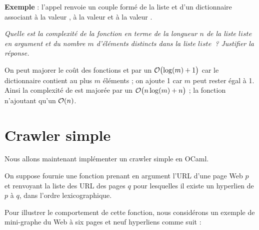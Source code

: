 {\bf Exemple} : l'appel  renvoie un couple formé de la liste \type{["x"; "zz"; "yt"]} et d'un dictionnaire associant à  la valeur , à  la valeur  et à  la valeur .
\begin{Exercise}\it
Quelle est la complexité de la fonction  en terme de la longueur $n$ de la liste $liste$ en argument et du nombre $m$ d'éléments distincts dans la liste $liste$~? Justifier la réponse.
\end{Exercise}
\begin{Answer}

On peut majorer le coût des fonctions  et  par un ${\cal O}\bigl(\log(m)+1\bigr)$ car le dictionnaire contient au plus $m$ éléments ; on ajoute 1 car $m$ peut rester égal à 1.
Ainsi la complexité de  est majorée par un ${\cal O}\bigl(n\log(m)+n\bigr)$ ; la fonction  n'ajoutant qu'un ${\cal O}(n)$.

\newpage
\end{Answer}
\section{Crawler simple}
Nous allons maintenant implémenter un crawler simple en OCaml. 

On suppose fournie une fonction  prenant en argument l'URL d'une page Web $p$ et renvoyant la liste des URL des pages $q$ pour lesquelles il existe un hyperlien de $p$ à $q$, dans l'ordre lexicographique.

Pour illustrer le comportement de cette fonction, nous considérons un exemple de mini-graphe du Web à six pages et neuf hyperliens comme suit :
\begin{center}
\end{center}


